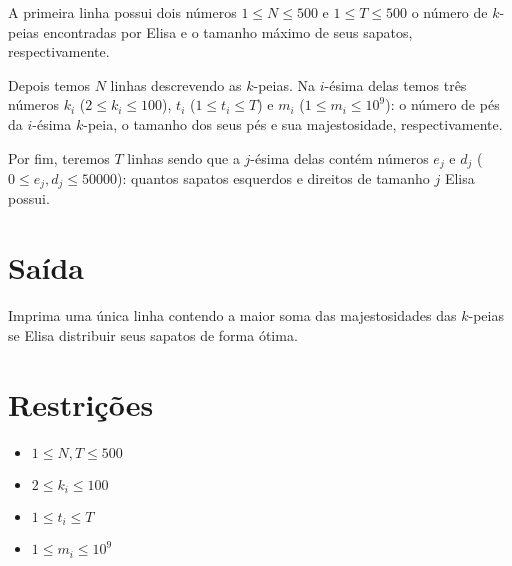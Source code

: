A primeira linha possui dois números $1 \leq N \leq 500$ e $1 \leq T \leq 500$ o número de $k$-peias encontradas por Elisa e o tamanho máximo de seus sapatos, respectivamente.

Depois temos $N$ linhas descrevendo as $k$-peias. Na $i$-ésima delas temos três números $k_i$ ($2 \leq k_i \leq 100$), $t_i$ ($1 \leq t_i \leq T$) e $m_i$ ($1 \leq m_i \leq 10^9$): o número de pés da $i$-ésima $k$-peia, o tamanho dos seus pés e sua majestosidade, respectivamente. 

Por fim, teremos $T$ linhas sendo que a $j$-ésima delas contém números $e_j$ e $d_j$ ($0 \leq e_j, d_j \leq 50000$): quantos sapatos esquerdos e direitos de tamanho $j$ Elisa possui.

%
%


\section*{Saída}

Imprima uma única linha contendo a maior soma das majestosidades das $k$-peias se Elisa distribuir seus sapatos de forma ótima.

\section*{Restrições}

\begin{itemize}
\item $ 1 \leq N, T \leq 500$
\item $2 \leq k_i \leq 100$
\item $1 \leq t_i \leq T$
\item $1 \leq m_i \leq 10^9$
\end{itemize}


\exemplo
